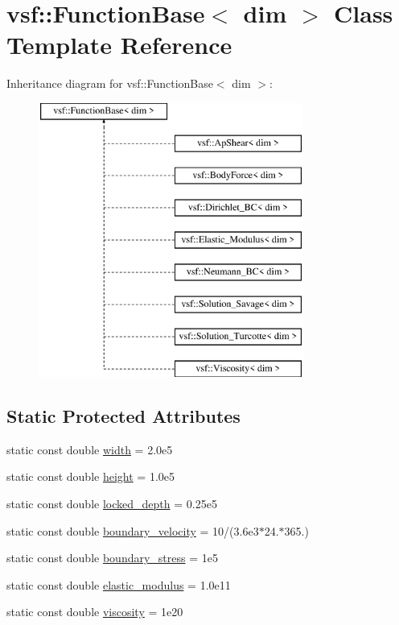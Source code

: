 \hypertarget{classvsf_1_1FunctionBase}{\section{vsf\-:\-:Function\-Base$<$ dim $>$ Class Template Reference}
\label{classvsf_1_1FunctionBase}
}
Inheritance diagram for vsf\-:\-:Function\-Base$<$ dim $>$\-:\begin{figure}[H]
\begin{center}
\leavevmode
\includegraphics[height=9.000000cm]{classvsf_1_1FunctionBase}
\end{center}
\end{figure}
\subsection*{Static Protected Attributes}
\begin{DoxyCompactItemize}
\item 
static const double \hyperlink{classvsf_1_1FunctionBase_ad2bf6791357d301b7d838b6188ef646e}{width} = 2.\-0e5
\item 
static const double \hyperlink{classvsf_1_1FunctionBase_acfffb54eadb79217d150a73e3797b25a}{height} = 1.\-0e5
\item 
static const double \hyperlink{classvsf_1_1FunctionBase_ae06ffa81ca26e9ead535d50596d852c1}{locked\-\_\-depth} = 0.\-25e5
\item 
static const double \hyperlink{classvsf_1_1FunctionBase_ae2bc27d347d942067f178bb02006ec44}{boundary\-\_\-velocity} = 10/(3.\-6e3$\ast$24.$\ast$365.)
\item 
static const double \hyperlink{classvsf_1_1FunctionBase_a342cfaf03d11de71ca34234f48e8825e}{boundary\-\_\-stress} = 1e5
\item 
static const double \hyperlink{classvsf_1_1FunctionBase_a4c09329f553545abcaaac65ab1913903}{elastic\-\_\-modulus} = 1.\-0e11
\item 
static const double \hyperlink{classvsf_1_1FunctionBase_af8a2b8711f526a821e1a37a396c9b48f}{viscosity} = 1e20
\end{DoxyCompactItemize}


